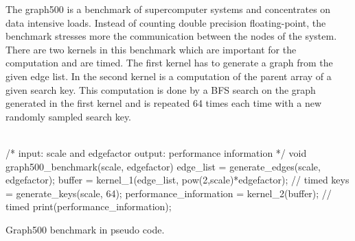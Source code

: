\documentclass[12pt,a4paper]{article}
\begin{document}
The graph500 \cite{graph500} is a benchmark of supercomputer systems and concentrates on data intensive loads. Instead of counting double precision floating-point, the benchmark stresses more the communication between the nodes of the system. There are two kernels in this benchmark which are important for the computation and are timed. The first kernel has to generate a graph from the given edge list. In the second kernel is a computation of the parent array of a given search key. This computation is done by a BFS search on the graph generated in the first kernel and is repeated 64 times each time with a new randomly sampled search key.\\
\\
\begin{listing}[H]
\begin{ccode}
/*
input: scale and edgefactor
output: performance information
*/
void graph500_benchmark(scale, edgefactor){
	edge_list = generate_edges(scale, edgefactor);
	buffer = kernel_1(edge_list, pow(2,scale)*edgefactor); // timed
	keys = generate_keys(scale, 64);
	performance_information = kernel_2(buffer); // timed
	print(performance_information);
}
\end{ccode}
\caption{Graph500 benchmark in pseudo code.}
\label{lst:graph500}
\end{listing}
\end{document}
